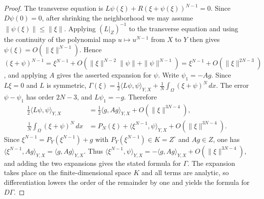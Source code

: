 \documentclass[11pt]{article}
\theoremstyle{definition}
\theoremstyle{remark}
\begin{document}
\begin{proof}
The transverse equation is $L\psi(\xi)+R(\xi+\psi(\xi))^{N-1}=0$.
Since $D\psi(0)=0$, after shrinking the neighborhood we may assume $\|\psi(\xi)\|\le\|\xi\|$. Applying $(L|_Z)^{-1}$ to the transverse equation and using the continuity of the polynomial map $u\mapsto u^{N-1}$ from $X$ to $Y$ then gives
$\psi(\xi)=O(\|\xi\|^{N-1})$. Hence $(\xi+\psi)^{N-1}=\xi^{N-1}+O(\|\xi\|^{N-2}\|\psi\|+\|\psi\|^{N-1})=\xi^{N-1}+O(\|\xi\|^{2N-3})$, and applying $A$ gives the asserted expansion for $\psi$.
Write $\psi_1=-Ag$. Since $L\xi=0$ and $L$ is symmetric, $\Gamma(\xi)=\frac12\langle L\psi,\psi\rangle_{Y,X}+\frac1N\int_\Omega(\xi+\psi)^N\,dx$.
The error $\psi-\psi_1$ has order $2N-3$, and $L\psi_1=-g$. Therefore
\begin{align*}
\frac12\langle L\psi,\psi\rangle_{Y,X}
&=\frac12\langle g,Ag\rangle_{Y,X}+O(\|\xi\|^{3N-4}),\\
\frac1N\int_\Omega(\xi+\psi)^N\,dx
&=P_N(\xi)+\langle\xi^{N-1},\psi\rangle_{Y,X}+O(\|\xi\|^{3N-4}).
\end{align*}
Since $\xi^{N-1}=P_Y(\xi^{N-1})+g$ with $P_Y(\xi^{N-1})\in K=Z^\circ$ and $Ag\in Z$, one has
$\langle \xi^{N-1},Ag\rangle_{Y,X}=\langle g,Ag\rangle_{Y,X}$. Thus $\langle\xi^{N-1},\psi\rangle_{Y,X}=-\langle g,Ag\rangle_{Y,X}+O(\|\xi\|^{3N-4})$, and adding the two expansions gives the stated formula for $\Gamma$.
The expansion takes place on the finite-dimensional space $K$ and all terms are analytic, so differentiation lowers the order of the remainder by one and yields the formula for $D\Gamma$.
\end{proof}
\end{document}
